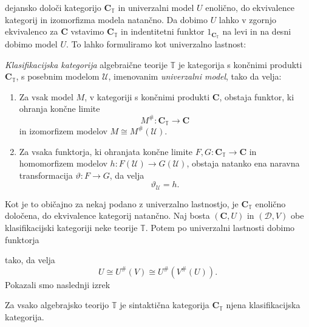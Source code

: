 \documentclass[../kategoricna_logika.tex]{subfiles}
\begin{document}
dejansko določi kategorijo $\mathbf{C}_{\mathbb{T}}$ in univerzalni model $U$ enolično,
do ekvivalence kategorij in izomorfizma modela natančno.
Da dobimo $U$ lahko v zgornjo ekvivalenco za $\mathbf{C}$ vstavimo $\mathbf{C}_{\mathbb{T}}$
in indentitetni funktor $1_{\mathbf{C}_{\mathbb{T}}}$ na levi in na desni dobimo
model $U$. To lahko formuliramo kot univerzalno lastnost:
\begin{definicija}
  \emph{Klasifikacijska kategorija} algebraične teorije $\mathbb{T}$
  je kategorija s končnimi produkti $\mathbf{C}_\mathbb{T}$, s
  posebnim modelom $\mathcal{U}$, imenovanim \emph{univerzalni model},
  tako da velja:
  \begin{enumerate}
  \item Za vsak model $M$, v kategoriji s končnimi produkti
    $\mathbf{C}$, obstaja funktor, ki ohranja končne limite
    $$M^{\#} : \mathbf{C}_\mathbb{T} \to \mathbf{C}$$ in izomorfizem
    modelov $M \cong M^{\#}(\mathcal{U})$.
%
  \item Za vsaka funktorja, ki ohranjata končne limite
    $F,G : \mathbf{C}_\mathbb{T} \to \mathbf{C}$ in homomorfizem
    modelov $h: F(\mathcal{U}) \to G(\mathcal{U})$, obstaja natanko
    ena naravna transformacija $\vartheta : F \to G$, da velja
$$\vartheta_\mathcal{U} = h.$$
\end{enumerate}
\end{definicija}
Kot je to običajno za nekaj podano z univerzalno lastnostjo,
je $\mathbf{C}_\mathbb{T}$ enolično določena, do ekvivalence kategorij natančno.
%
Naj bosta $(\mathbf{C}, U)$ in $(\mathcal{D}, V)$ obe klasifikacijski
kategoriji neke teorije $\mathbb{T}$. Potem po univerzalni lastnosti
dobimo funktorja
\begin{center}
\end{center}
tako, da velja
$$U \cong U^{\#}(V) \cong U^{\#}(V^{\#}(U)).$$
Pokazali smo naslednji izrek
\begin{izrek}
\label{sec:klasifikacijska-kategorija-alg-teorije}
Za vsako algebrajsko teorijo $\mathbb{T}$ je sintaktična kategorija $\mathbf{C}_{\mathbb{T}}$
njena klasifikacijska kategorija.
\end{izrek}
\end{document}
